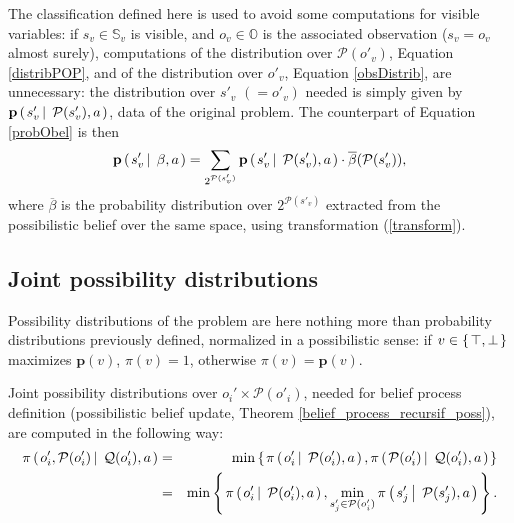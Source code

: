 The classification defined here is used to avoid some computations for visible variables:
if $s_{v} \in \mathbb{S}_v$ is visible, and $o_{v} \in \mathbb{O}$ is the associated observation ($s_v=o_v$ almost surely), 
computations of the distribution over $\mathcal{P}(o'_v)$, Equation \ref{distribPOP}, and
of the distribution over $o'_v$, Equation \ref{obsDistrib}, are unnecessary: the distribution 
over $s'_v$ $(=o'_v)$ needed is simply given by $\textbf{p} \left( \left.  s'_v \, \right| \left. \, \mathcal{P}(s'_v), a  \right. \right) $, 
data of the original problem. The counterpart of Equation \ref{probObel} is then
\begin{equation}
\label{probSVbel}
\textbf{p} \left( \left.  s'_v \, \right| \left. \, \beta, a  \right. \right) = \sum_{2^{\mathcal{P}(s'_v)}} \textbf{p} \left( \left.  s'_v \, \right| \left. \, \mathcal{P}(s'_v), a  \right. \right) \cdot \overline{\beta}(\mathcal{P}(s'_v)),
\end{equation}
where $\overline{\beta}$ is the probability distribution over $2^{\mathcal{P}(s'_v)}$ 
extracted from the possibilistic belief over the same space, using transformation (\ref{transform}).
\subsection{Joint possibility distributions}
Possibility distributions of the problem are here
nothing more than probability distributions previously defined, normalized 
in a possibilistic sense: if $v \in \left\{ \left. \top,\bot \right. \right\}$ maximizes $\textbf{p}(v)$,
$\pi(v)=1$, otherwise $\pi(v)=\textbf{p}(v)$.

Joint possibility distributions over $o_i' \times \mathcal{P}(o'_i)$, needed for belief process definition (possibilistic belief update, Theorem \ref{belief_process_recursif_poss}), 
are computed in the following way:
\begin{eqnarray*}
\pi \left( \left.  o_i', \mathcal{P}(o'_i) \, \right| \left. \, \mathcal{Q}(o'_i), a  \right. \right) & = & \min \left\{ \left.  \pi \left( \left.  o_i' \, \right| \left. \, \mathcal{P}(o'_i), a \right. \right), \pi \left( \left.  \mathcal{P}(o'_i) \, \right| \left. \, \mathcal{Q}(o'_i), a   \right. \right)  \right. \right\} \\
& = & \min \left\{ \left.  \pi \left( \left.  o_i' \, \right| \left. \, \mathcal{P}(o'_i), a \right. \right), \min_{s'_j \in \mathcal{P}(o'_i)} \pi \left( \left.  s'_j \, \right| \left. \, \mathcal{P}(s'_j), a   \right. \right)  \right. \right\}.
\end{eqnarray*}


